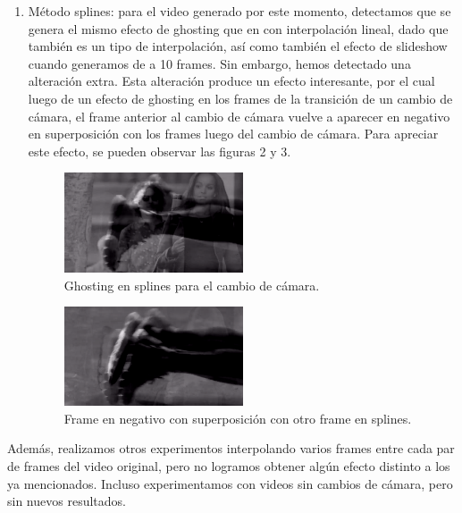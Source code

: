 \begin{enumerate}
\item M\'etodo splines: para el video generado por este momento, detectamos que se genera el mismo efecto de ghosting que en con interpolaci\'on lineal, dado que tambi\'en es un tipo de interpolaci\'on, as\'i como tambi\'en el efecto de slideshow cuando generamos de a 10 frames. Sin embargo, hemos detectado una alteraci\'on extra. Esta alteraci\'on produce un efecto interesante, por el cual luego de un efecto de ghosting en los frames de la transici\'on de un cambio de c\'amara, el frame anterior al cambio de c\'amara vuelve a aparecer en negativo en superposici\'on con los frames luego del cambio de c\'amara. Para apreciar este efecto, se pueden observar las figuras 2 y 3.

\begin{figure}[H]
  \centering
    \includegraphics[width=0.5\textwidth]{img/ghosting_splines_1.png}
  	\caption{Ghosting en splines para el cambio de c\'amara.}
\end{figure}

\begin{figure}[H]
  \centering
    \includegraphics[width=0.5\textwidth]{img/ghosting_negative.png}
  	\caption{Frame en negativo con superposici\'on con otro frame en splines.}
\end{figure}

\end{enumerate}

Adem\'as, realizamos otros experimentos interpolando varios frames entre cada par de frames del video original, pero no logramos obtener alg\'un efecto distinto a los ya mencionados. Incluso experimentamos con videos sin cambios de c\'amara, pero sin nuevos resultados.
